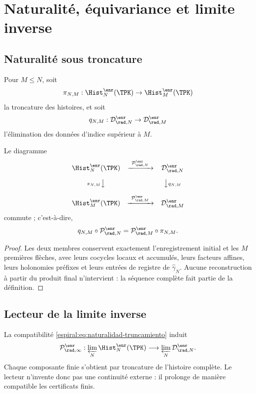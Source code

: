 \chapter{Naturalité, équivariance et limite inverse}

\section{Naturalité sous troncature}

Pour \(M\le N\), soit
\[
 \pi_{N,M}:\Hist_N^{\enr}(\TPK)\to\Hist_M^{\enr}(\TPK)
\]
la troncature des histoires, et soit
\[
 q_{N,M}:\mathcal D_{\rad,N}^{\enr}\to
 \mathcal D_{\rad,M}^{\enr}
\]
l'élimination des données d'indice supérieur à \(M\).

\begin{theorem}
Le diagramme
\[
\begin{array}{ccc}
\Hist_N^{\enr}(\TPK)
 & \xrightarrow{\ \mathcal P_{\rad,N}^{\enr}\ }
 & \mathcal D_{\rad,N}^{\enr}\\[1.0em]
{\scriptstyle \pi_{N,M}}\big\downarrow
 && \big\downarrow{\scriptstyle q_{N,M}}\\[1.0em]
\Hist_M^{\enr}(\TPK)
 & \xrightarrow{\ \mathcal P_{\rad,M}^{\enr}\ }
 & \mathcal D_{\rad,M}^{\enr}
\end{array}
\]
commute ; c'est-à-dire,
\begin{equation}
 q_{N,M}\circ\mathcal P_{\rad,N}^{\enr}
 =\mathcal P_{\rad,M}^{\enr}\circ\pi_{N,M}.
 \label{espiral:eq:naturalidad-truncamiento}
\end{equation}
\end{theorem}
\begin{proof}
Les deux membres conservent exactement l'enregistrement initial et les \(M\) premières flèches, avec leurs cocycles locaux et accumulés, leurs facteurs affines, leurs holonomies préfixes et leurs entrées de registre de \(\widehat\gamma_N\). Aucune reconstruction à partir du produit final n'intervient : la séquence complète fait partie de la définition.
\end{proof}

\section{Lecteur de la limite inverse}

La compatibilité \cref{espiral:eq:naturalidad-truncamiento} induit
\begin{equation}
 \mathcal P_{\rad,\infty}^{\enr}:
 \varprojlim_N\Hist_N^{\enr}(\TPK)
 \longrightarrow
 \varprojlim_N\mathcal D_{\rad,N}^{\enr}.
 \label{espiral:eq:lector-limite-inverso}
\end{equation}
Chaque composante finie s'obtient par troncature de l'histoire complète. Le lecteur n'invente donc pas une continuité externe : il prolonge de manière compatible les certificats finis.

